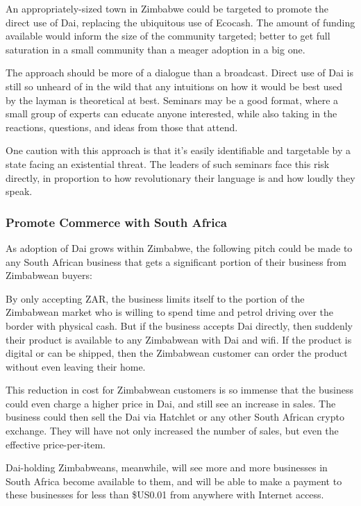 \documentclass{article}
\begin{document}
An appropriately-sized town in Zimbabwe could be targeted to promote the direct use of Dai, replacing the ubiquitous use of Ecocash. The amount of funding available would inform the size of the community targeted; better to get full saturation in a small community than a meager adoption in a big one.

The approach should be more of a dialogue than a broadcast. Direct use of Dai is still so unheard of in the wild that any intuitions on how it would be best used by the layman is theoretical at best. Seminars may be a good format, where a small group of experts can educate anyone interested, while also taking in the reactions, questions, and ideas from those that attend.

One caution with this approach is that it's easily identifiable and targetable by a state facing an existential threat. The leaders of such seminars face this risk directly, in proportion to how revolutionary their language is and how loudly they speak.

\subsubsection{Promote Commerce with South Africa} \label{promote south africa}

As adoption of Dai grows within Zimbabwe, the following pitch could be made to any South African business that gets a significant portion of their business from Zimbabwean buyers:

By only accepting ZAR, the business limits itself to the portion of the Zimbabwean market who is willing to spend time and petrol driving over the border with physical cash. But if the business accepts Dai directly, then suddenly their product is available to any Zimbabwean with Dai and wifi. If the product is digital or can be shipped, then the Zimbabwean customer can order the product without even leaving their home.

This reduction in cost for Zimbabwean customers is so immense that the business could even charge a higher price in Dai, and still see an increase in sales. The business could then sell the Dai via Hatchlet or any other South African crypto exchange. They will have not only increased the number of sales, but even the effective price-per-item.

Dai-holding Zimbabweans, meanwhile, will see more and more businesses in South Africa become available to them, and will be able to make a payment to these businesses for less than \$US0.01 from anywhere with Internet access.
\end{document}
